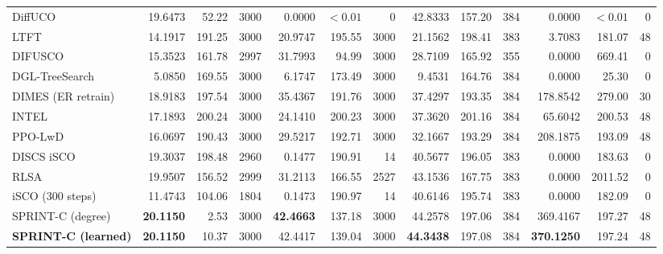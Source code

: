 \begin{table}[t]
{\begin{tabular}{lrrrrrrrrrrrr}
DiffUCO & 19.6473 & 52.22 & 3000 & 0.0000 & $<0.01$ & 0 & 42.8333 & 157.20 & 384 & 0.0000 & $<0.01$ & 0 \\
LTFT & 14.1917 & 191.25 & 3000 & 20.9747 & 195.55 & 3000 & 21.1562 & 198.41 & 383 & 3.7083 & 181.07 & 48 \\
DIFUSCO & 15.3523 & 161.78 & 2997 & 31.7993 & 94.99 & 3000 & 28.7109 & 165.92 & 355 & 0.0000 & 669.41 & 0 \\
DGL-TreeSearch & 5.0850 & 169.55 & 3000 & 6.1747 & 173.49 & 3000 & 9.4531 & 164.76 & 384 & 0.0000 & 25.30 & 0 \\
DIMES (ER retrain) & 18.9183 & 197.54 & 3000 & 35.4367 & 191.76 & 3000 & 37.4297 & 193.35 & 384 & 178.8542 & 279.00 & 30 \\
INTEL & 17.1893 & 200.24 & 3000 & 24.1410 & 200.23 & 3000 & 37.3620 & 201.16 & 384 & 65.6042 & 200.53 & 48 \\
PPO-LwD & 16.0697 & 190.43 & 3000 & 29.5217 & 192.71 & 3000 & 32.1667 & 193.29 & 384 & 208.1875 & 193.09 & 48 \\
DISCS iSCO & 19.3037 & 198.48 & 2960 & 0.1477 & 190.91 & 14 & 40.5677 & 196.05 & 383 & 0.0000 & 183.63 & 0 \\
RLSA & 19.9507 & 156.52 & 2999 & 31.2113 & 166.55 & 2527 & 43.1536 & 167.75 & 383 & 0.0000 & 2011.52 & 0 \\
iSCO (300 steps) & 11.4743 & 104.06 & 1804 & 0.1473 & 190.97 & 14 & 40.6146 & 195.74 & 383 & 0.0000 & 182.09 & 0 \\
\midrule
\rowcolor{TableGreen}
SPRINT-C (degree) & \textbf{20.1150} & 2.53 & 3000 & \textbf{42.4663} & 137.18 & 3000 & 44.2578 & 197.06 & 384 & 369.4167 & 197.27 & 48 \\
\rowcolor{TableBlue}
\textbf{SPRINT-C (learned)} & \textbf{20.1150} & 10.37 & 3000 & 42.4417 & 139.04 & 3000 & \textbf{44.3438} & 197.08 & 384 & \textbf{370.1250} & 197.24 & 48 \\
\bottomrule
\end{tabular}}
\end{table}
